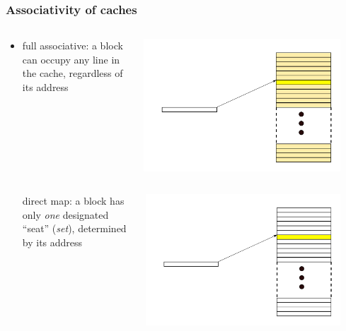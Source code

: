 \documentclass[12pt,dvipdfmx]{beamer}
\newcommand{\aka}[1]{{\color{red}#1}}
\begin{document}
\begin{frame}
\frametitle{Associativity of caches}
\begin{itemize}
\item []

\begin{columns}
  \begin{column}{0.65\textwidth}
\aka{full associative:} a block can occupy any line in the cache,
  regardless of its address
\end{column}
  \begin{column}{0.3\textwidth}
\includegraphics[width=0.9\textwidth]{out/pdf/svg/associativity_1.pdf}

  \end{column}
\end{columns}


\begin{columns}
  \begin{column}{0.65\textwidth}
\aka{direct map:} a block has only \aka{\em one} 
  designated ``seat'' (\aka{\em set}), determined by its address
\end{column}
  \begin{column}{0.3\textwidth}
\includegraphics[width=0.9\textwidth]{out/pdf/svg/associativity_2.pdf}


\end{column}
\end{columns}
\end{itemize}
\end{frame}
\end{document}

